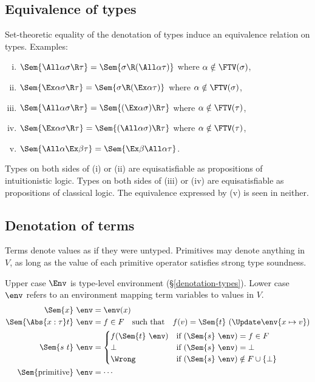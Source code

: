 \documentclass{amsart}
\theoremstyle{definition}
\begin{document}
\subsection{Equivalence of types}
Set-theoretic equality of the denotation of types induce an
equivalence relation on types. Examples:
\begin{enumerate}[(i)]
\item
$\Sem{\All\alpha\sigma\R\tau}=\Sem{\sigma\R(\All\alpha\tau)}$
where $\alpha\notin\FTV(\sigma)$,
\item
$\Sem{\Ex\alpha\sigma\R\tau}=\Sem{\sigma\R(\Ex\alpha\tau)}$
where $\alpha\notin\FTV(\sigma)$,
\item
$\Sem{\All\alpha\sigma\R\tau}=\Sem{(\Ex\alpha\sigma)\R\tau}$
where $\alpha\notin\FTV(\tau)$,
\item
$\Sem{\Ex\alpha\sigma\R\tau}=\Sem{(\All\alpha\sigma)\R\tau}$
where $\alpha\notin\FTV(\tau)$,
\item
$\Sem{\All\alpha\Ex\beta\tau}=\Sem{\Ex\beta\All\alpha\tau}$.
\end{enumerate}
Types on both sides of (i) or (ii) are equisatisfiable as
propositions of intuitionistic logic. Types on both sides of
(iii) or (iv) are equisatisfiable as propositions of classical
logic. The equivalence expressed by (v) is seen in neither.


\subsection{Denotation of terms}
\label{denotation-terms}
Terms denote values as if they were untyped. Primitives may
denote anything in $V$, as long as the value of each primitive
operator satisfies strong type soundness.

Upper case $\Env$ is type-level environment
(\S\ref{denotation-types}). Lower case $\env$ refers to an
environment mapping term variables to values in $V$.
\begin{align*}
\Sem{x}~\env&=\env(x)\\
\Sem{\Abs{x:\tau}t}~\env&=
  f\in F\text{\quad such that\quad}
  f(v)=\Sem{t}~(\Update\env{x\mapsto v})
\\
\Sem{s~t}~\env&=
\begin{cases}
f(\Sem{t}~\env)&\text{if }(\Sem{s}~\env)=f\in F
\\
\bot&\text{if }(\Sem{s}~\env)=\bot
\\
\Wrong&\text{if }(\Sem{s}~\env)\notin F\cup\{\bot\}
\end{cases}
\\
\Sem{\mathrm{primitive}}~\env&=\cdots
\end{align*}
\end{document}
